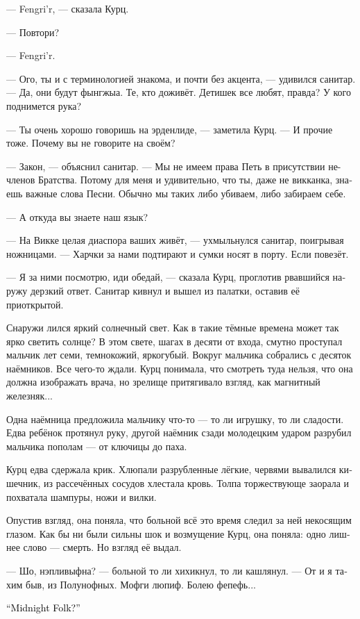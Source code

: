 \documentclass[a4paper,12pt,fleqn]{book}\usepackage{cooltooltips}\usepackage{polyglossia}\setdefaultlanguage[babelshorthands=true]{russian}\setotherlanguage{english}\defaultfontfeatures{Ligatures=TeX,Mapping=tex-text} \usepackage{xcolor}\definecolor{lightgray}{HTML}{bbbbbb}\color{lightgray}\newcommand{\ml}[3]{\textenglish{\textcolor{black}{#3}}}
\begin{document}
--- Fengri'r, --- сказала Курц.

--- Повтори?

--- Fengri'r.

--- Ого, ты и с терминологией знакома, и почти без акцента, --- удивился санитар.
--- Да, они будут фынгжыа.
Те, кто доживёт.
Детишек все любят, правда?
У кого поднимется рука?

--- Ты очень хорошо говоришь на эрденлиде, --- заметила Курц.
--- И прочие тоже.
Почему вы не говорите на своём?

--- Закон, --- объяснил санитар.
--- Мы не имеем права Петь в присутствии не-членов Братства.
Потому для меня и удивительно, что ты, даже не викканка, знаешь важные слова Песни.
Обычно мы таких либо убиваем, либо забираем себе.

--- А откуда вы знаете наш язык?

--- На Викке целая диаспора ваших живёт, --- ухмыльнулся санитар, поигрывая ножницами.
--- Харчки за нами подтирают и сумки носят в порту.
Если повезёт.

--- Я за ними посмотрю, иди обедай, --- сказала Курц, проглотив рвавшийся наружу дерзкий ответ.
Санитар кивнул и вышел из палатки, оставив её приоткрытой.

Снаружи лился яркий солнечный свет.
Как в такие тёмные времена может так ярко светить солнце?
В этом свете, шагах в десяти от входа, смутно проступал мальчик лет семи, темнокожий, яркогубый.
Вокруг мальчика собрались с десяток наёмников.
Все чего-то ждали.
Курц понимала, что смотреть туда нельзя, что она должна изображать врача, но зрелище притягивало взгляд, как магнитный железняк...

Одна наёмница предложила мальчику что-то --- то ли игрушку, то ли сладости.
Едва ребёнок протянул руку, другой наёмник сзади молодецким ударом разрубил мальчика пополам --- от ключицы до паха.

Курц едва сдержала крик.
Хлюпали разрубленные лёгкие, червями вывалился кишечник, из рассечённых сосудов хлестала кровь.
Толпа торжествующе заорала и похватала шампуры, ножи и вилки.

Опустив взгляд, она поняла, что больной всё это время следил за ней некосящим глазом.
Как бы ни были сильны шок и возмущение Курц, она поняла: одно лишнее слово --- смерть.
Но взгляд её выдал.

--- Шо, нэпливыфна? --- больной то ли хихикнул, то ли кашлянул.
--- От и я тахим быв, из Полунофных.
Мофги люпиф.
Болею фепефь...

\ml{$0$}
{--- Полуночных?}
{``Midnight Folk?''}
\end{document}
